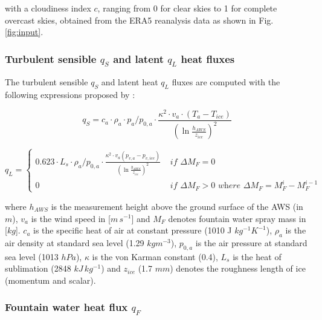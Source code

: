 \documentclass[utf8]{frontiersSCNS} %
\begin{document}
with a cloudiness index $c$, ranging from 0 for clear skies to 1 for complete overcast skies, obtained from the ERA5
reanalysis data as shown in Fig.  \ref{fig:input}.

\subsubsection{Turbulent sensible $q_{S}$ and latent $q_{L}$ heat fluxes }

The turbulent sensible $q_{S}$ and latent heat $q_{L}$ fluxes are computed with the following expressions proposed by
\cite{Garratt_1992}:

\begin{equation} q_{S}=c_{a} \cdot \rho_{a} \cdot p_{a}/p_{0,a} \cdot \frac{\kappa^2 \cdot v_a \cdot
(T_a-T_{ice})}{{(\ln{\frac{h_{AWS}}{z_{ice}}})}^2} \label{eqn:qs} \end{equation}

\begin{equation} q_{L} = \left\{ \begin{array}{ll}
        
         0.623 \cdot L_s \cdot \rho_{a}/p_{0,a} \cdot \frac{\kappa^2 \cdot
         v_a(p_{v,a}-p_{v,ice})}{{(\ln{\frac{h_{AWS}}{z_{ice}}})}^2} & \textit{ if } \Delta M_{F} = 0\\ 0 & \textit{ if
       } \Delta M_{F} > 0 \textit{ where } \Delta M_{F} = M_{F}^{i} - M_{F}^{i-1}
         
    \end{array} \right.  \label{eqn:ql} \end{equation}

where $h_{AWS}$ is the measurement height above the ground surface of the AWS (in $m$), $v_a$ is the wind speed in
[$m\,s^{-1}$] and $M_{F}$ denotes fountain water spray mass in [$kg$]. $c_a$ is the specific heat of air at constant
pressure (1010 J $kg^{-1} K^{-1}$), $\rho_{a}$ is the air density at standard sea level (1.29 $kg m^{-3}$), $p_{0,a}$ is
the air pressure at standard sea level (1013 $hPa$), $\kappa$ is the von Karman constant (0.4), $L_s$ is the heat of
sublimation (2848 $kJ\, kg^{-1}$) and $z_{ice}$ (1.7 $mm$) denotes the roughness length of ice (momentum and scalar).


\subsubsection{Fountain water heat flux $q_{F}$ }
\end{document}
